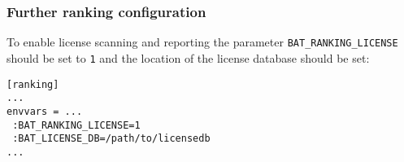 \documentclass[11pt]{beamer}
\begin{document}
\begin{frame}[fragile]
\frametitle{Further ranking configuration}
To enable license scanning and reporting the parameter \texttt{BAT\_RANKING\_LICENSE} should be set to \texttt{1} and the location of the license database should be set:

\begin{verbatim}
[ranking]
...
envvars = ...
 :BAT_RANKING_LICENSE=1
 :BAT_LICENSE_DB=/path/to/licensedb
...
\end{verbatim}
\end{frame}

\end{document}

